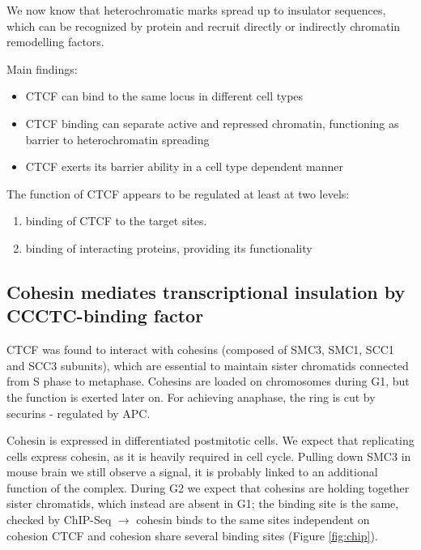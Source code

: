 We now know that heterochromatic marks spread up to insulator sequences, which can be recognized by protein and recruit directly or indirectly chromatin remodelling factors.

Main findings:

\begin{itemize}
\tightlist
\item
  CTCF can bind to the same locus in different cell types
\item
  CTCF binding can separate active and repressed chromatin, functioning as barrier to heterochromatin spreading
\item
  CTCF exerts its barrier ability in a cell type dependent manner
\end{itemize}

The function of CTCF appears to be regulated at least at two levels:

\begin{enumerate}
\def\labelenumi{\arabic{enumi}.}
\tightlist
\item
  binding of CTCF to the target sites.
\item
  binding of interacting proteins, providing its functionality
\end{enumerate}

\hypertarget{cohesin-mediates-transcriptional-insulation-by-ccctc-binding-factor}{%
\subsection{Cohesin mediates transcriptional insulation by CCCTC-binding factor}\label{cohesin-mediates-transcriptional-insulation-by-ccctc-binding-factor}}

CTCF was found to interact with cohesins (composed of SMC3, SMC1, SCC1 and SCC3 subunits), which are essential to maintain sister chromatids connected from S phase to metaphase. Cohesins are loaded on chromosomes during G1, but the function is exerted later on. For achieving anaphase, the ring is cut by securins - regulated by APC.

Cohesin is expressed in differentiated postmitotic cells. We expect that replicating cells express cohesin, as it is heavily required in cell cycle. Pulling down SMC3 in mouse brain we still observe a signal, it is probably linked to an additional function of the complex. During G2 we expect that cohesins are holding together sister chromatids, which instead are absent in G1; the binding site is the same, checked by ChIP-Seq $\rightarrow$ cohesin binds to the same sites independent on cohesion CTCF and cohesion share several binding sites (Figure \ref{fig:chip}).

